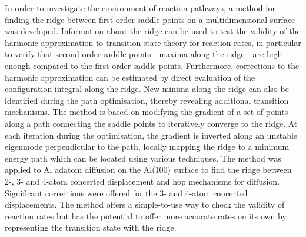 In order to investigate the environment of reaction pathways, a method for finding the ridge between first order saddle points on a multidimensional surface was developed.
Information about the ridge can be used to test the validity of the harmonic approximation to transition state theory for reaction rates,
in particular to verify that second order saddle points - maxima along the ridge - are high enough compared to the first order saddle points.
Furthermore, corrections to the harmonic approximation can be estimated by direct evaluation of the configuration integral along the ridge.
New minima along the ridge can also be identified during the path optimisation,
thereby revealing additional transition mechanisms.
The method is based on modifying the gradient of a set of points along a path connecting the saddle points to iteratively converge to the ridge.
At each iteration during the optimisation, the gradient is inverted along an unstable eigenmode perpendicular to the path, locally mapping the ridge to a minimum energy path which can be located using various techniques.
The method was applied to Al adatom diffusion on the Al(100) surface to find the ridge between 2-, 3- and 4-atom concerted displacement
and hop mechanisms for diffusion.
Significant corrections were offered for the 3- and 4-atom concerted displacements.
The method offers a simple-to-use way to check the validity of reaction rates but has the potential to offer more accurate rates on its own by representing the transition state with the ridge.
